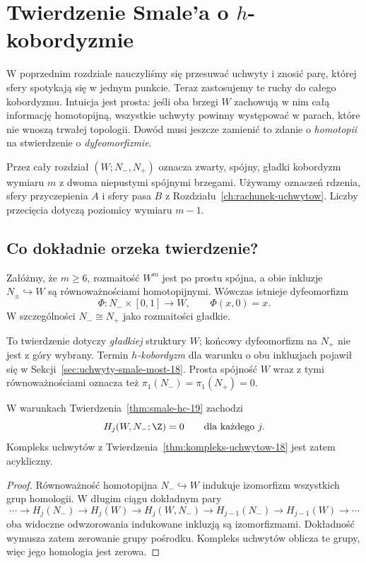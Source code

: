 \chapter{Twierdzenie Smale'a o \texorpdfstring{$h$}{h}-kobordyzmie}
\label{ch:hcobordyzm}

W poprzednim rozdziale nauczyliśmy się
przesuwać uchwyty i znosić parę, której
sfery spotykają się w jednym punkcie.
Teraz zastosujemy te ruchy do całego
kobordyzmu. Intuicja jest prosta:
jeśli oba brzegi $W$ zachowują w nim
całą informację homotopijną, wszystkie
uchwyty powinny występować w parach,
które nie wnoszą trwałej topologii.
Dowód musi jeszcze zamienić to zdanie
o \emph{homotopii} na stwierdzenie
o \emph{dyfeomorfizmie}.

Przez cały rozdział $(W;N_-,N_+)$
oznacza zwarty, spójny, gładki
kobordyzm wymiaru $m$ z dwoma
niepustymi spójnymi brzegami.
Używamy oznaczeń rdzenia, sfery
przyczepienia $A$ i sfery pasa $B$
z Rozdziału~\ref{ch:rachunek-uchwytow}.
Liczby przecięcia dotyczą poziomicy
wymiaru $m-1$.

\section{Co dokładnie orzeka twierdzenie?}
\label{sec:stwierdzenie-hc-19}

\begin{twierdzenie}
\label{thm:smale-hc-19}
Załóżmy, że $m\geq6$, rozmaitość
$W^m$ jest po prostu spójna, a obie
inkluzje $N_\pm\hookrightarrow W$
są równoważnościami homotopijnymi.
Wówczas istnieje dyfeomorfizm
\[
 \Phi:N_-\times[0,1]\longrightarrow W,
 \qquad \Phi(x,0)=x.
\]
W szczególności $N_-\cong N_+$
jako rozmaitości gładkie.
\end{twierdzenie}

To twierdzenie dotyczy \emph{gładkiej}
struktury $W$; końcowy dyfeomorfizm
na $N_+$ nie jest z góry wybrany.
Termin \emph{$h$-kobordyzm} dla
warunku o obu inkluzjach pojawił się
w Sekcji~\ref{sec:uchwyty-smale-most-18}.
Prosta spójność $W$ wraz z tymi
równoważnościami oznacza też
$\pi_1(N_-)=\pi_1(N_+)=0$.

\begin{stwierdzenie}[Acykliczność]
\label{prop:acykliczny-hc-19}
W warunkach
Twierdzenia~\ref{thm:smale-hc-19}
zachodzi
\[
 H_j(W,N_-;\Z)=0
 \qquad\text{dla każdego }j.
\]
Kompleks uchwytów z
Twierdzenia~\ref{thm:kompleks-uchwytow-18}
jest zatem acykliczny.
\end{stwierdzenie}
\begin{proof}
Równoważność homotopijna
$N_-\hookrightarrow W$ indukuje
izomorfizm wszystkich grup homologii.
W długim ciągu dokładnym pary
\[
 \cdots\to H_j(N_-)\to H_j(W)
 \to H_j(W,N_-)\to H_{j-1}(N_-)
 \to H_{j-1}(W)\to\cdots
\]
oba widoczne odwzorowania indukowane inkluzją
są izomorfizmami. Dokładność wymusza
zatem zerowanie grupy pośrodku.
Kompleks uchwytów oblicza te grupy,
więc jego homologia jest zerowa.
\end{proof}

